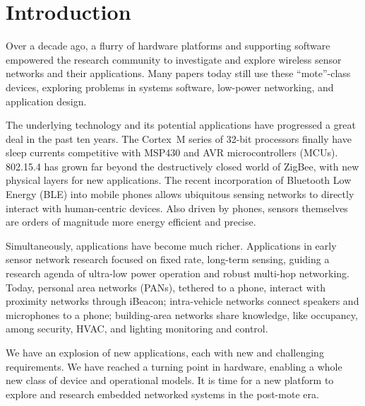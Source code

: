 \section{Introduction}
\label{sec:intro}

Over a decade ago, a flurry of hardware platforms and supporting software
empowered the research community to investigate and explore wireless sensor
networks and their applications. Many papers today still use these
``mote''-class devices, exploring problems in systems software, low-power
networking, and application design.

The underlying technology and its potential applications have progressed a
great deal in the past ten years. The Cortex~M series of 32-bit processors
finally have sleep currents competitive with MSP430 and AVR microcontrollers (MCUs).
802.15.4 has grown far beyond the destructively closed world of ZigBee, with
new physical layers for new applications. The recent incorporation of
Bluetooth Low Energy (BLE) into mobile phones allows ubiquitous sensing networks to
directly interact with human-centric devices. Also driven by phones, sensors
themselves are orders of magnitude more energy efficient and precise.

Simultaneously, applications have become much richer. Applications in early
sensor network research focused on fixed rate, long-term sensing, guiding a
research agenda of ultra-low power operation and robust multi-hop networking.
Today, personal area networks (PANs), tethered to a phone, interact with
proximity networks through iBeacon; intra-vehicle networks connect speakers
and microphones to a phone; building-area networks share knowledge, like
occupancy, among security, HVAC, and lighting monitoring and control.

We have an explosion of new applications, each with new and challenging
requirements. We have reached a turning point in hardware, enabling a whole
new class of device and operational models. It is time for a new platform to
explore and research embedded networked systems in the post-mote era.

